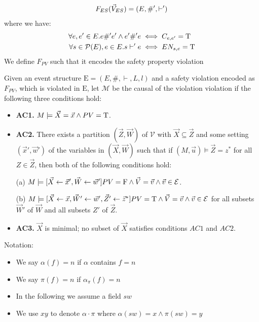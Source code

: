 \begin{frame}
    \begin{align*}
        F_{ES}(\vec V_{ES}) = (E,\#',\vdash')
    \end{align*}
    where we have:
    \begin{align*}
        \forall e,e' \in E. e \#' e' \wedge e' \#' e
         & \iff C_{e,e'} = \mathrm{T} \\
        \forall s \in \mathcal{P}(E), e \in E.  s \vdash' e
         & \iff EN_{s,e} = \mathrm{T}
    \end{align*}
    We define $F_{PV}$ such that it encodes the safety property violation
\end{frame}

\begin{frame}
    Given an event structure $\mathrm{E} = (E,\#,\vdash,L,l)$ 
    and a safety violation encoded as $F_{PV}$, which is violated 
    in $\mathrm{E}$, let $\mathcal{M}$ be the causal of the violation
    violation if the following three conditions hold:
    \begin{itemize}
        \item  \textbf{AC1.} $M\models \vec X = \vec x
                  \wedge PV = \mathrm{T}$.
        \item  \textbf{AC2. }There exists a partition $(\vec Z, \vec W)$ of $\mathcal{V}$ with $\vec X \subseteq \vec Z$ and some setting $(\vec x',\vec w')$ of the variables in $(\vec X,\vec W)$ such that if $(M,\vec u)\models \vec Z = z^*$ for all $Z\in \vec Z$, then both of the following conditions hold:

              (a) $M \models[\vec X \leftarrow \vec x', \vec W \leftarrow \vec w']
                  PV = \mathrm{F}
                  \wedge \vec V = \vec v
                  \wedge  \vec v \in \mathcal{E}$.

              (b) $M \models[\vec X\leftarrow \vec x, \vec W' \leftarrow \vec w', \vec Z'\leftarrow \vec z^*]
                  PV = \mathrm{T}
                  \wedge \vec V = \vec v
                  \wedge \vec v \in \mathcal{E}$
              for all subsets $\vec W'$ of $\vec W$ and all subsets $Z'$ of $\vec Z$.

        \item  \textbf{AC3.} $\vec X$ is minimal; no subset of $\vec X$ satisfies conditions $AC1$ and $AC2$.
    \end{itemize}
\end{frame}

\begin{frame}
    Notation:
    \begin{itemize}
        \item We say $\alpha(f) = n$ if $\alpha$ contains $f = n$
        \item We say $\pi(f) = n$ if $\alpha_{\pi}(f) = n$
        \item In the following we assume a field $sw$
        \item We use $xy$ to denote $\alpha\cdot\pi$ where 
        $\alpha(sw) = x \wedge \pi(sw) = y$
    \end{itemize}
\end{frame}